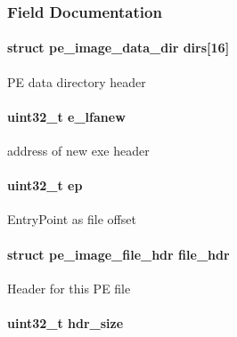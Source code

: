 \subsubsection{Field Documentation}
\hypertarget{structcli__pe__hook__data_aacc309d29c73dbd6ac72ee719e331097}{
\paragraph[{dirs}]{\setlength{\rightskip}{0pt plus 5cm}struct {\bf pe\_\-image\_\-data\_\-dir} {\bf dirs}\mbox{[}16\mbox{]}}}
\label{structcli__pe__hook__data_aacc309d29c73dbd6ac72ee719e331097}
PE data directory header \hypertarget{structcli__pe__hook__data_a3d0539adcc53a30b31c2a18bc8b84e00}{
\paragraph[{e\_\-lfanew}]{\setlength{\rightskip}{0pt plus 5cm}uint32\_\-t {\bf e\_\-lfanew}}}
\label{structcli__pe__hook__data_a3d0539adcc53a30b31c2a18bc8b84e00}
address of new exe header \hypertarget{structcli__pe__hook__data_afaed4671662028c061ab84eefcce0546}{
\paragraph[{ep}]{\setlength{\rightskip}{0pt plus 5cm}uint32\_\-t {\bf ep}}}
\label{structcli__pe__hook__data_afaed4671662028c061ab84eefcce0546}
EntryPoint as file offset \hypertarget{structcli__pe__hook__data_a3b996731cad79e0040fc0e4613d20533}{
\paragraph[{file\_\-hdr}]{\setlength{\rightskip}{0pt plus 5cm}struct {\bf pe\_\-image\_\-file\_\-hdr} {\bf file\_\-hdr}}}
\label{structcli__pe__hook__data_a3b996731cad79e0040fc0e4613d20533}
Header for this PE file \hypertarget{structcli__pe__hook__data_af2492dd421362ffced98eb583964b310}{
\paragraph[{hdr\_\-size}]{\setlength{\rightskip}{0pt plus 5cm}uint32\_\-t {\bf hdr\_\-size}}}
